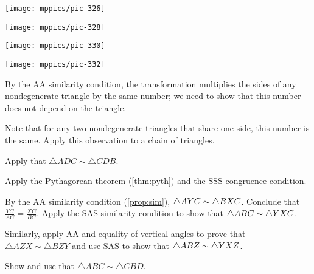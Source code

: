 \begin{multicols}{2}
\begin{Figure}
\begin{minipage}{.49\textwidth}
\centering
\texttt{[image: mppics/pic-326]}
\end{minipage}
\hfill
\begin{minipage}{.49\textwidth}
\centering
\texttt{[image: mppics/pic-328]}
\end{minipage}
\end{Figure}

\begin{Figure}
\begin{minipage}{.49\textwidth}
\centering
\texttt{[image: mppics/pic-330]}
\end{minipage}
\hfill
\begin{minipage}{.49\textwidth}
\centering
\texttt{[image: mppics/pic-332]}
\end{minipage}
\end{Figure}

\setcounter{eqtn}{0}

By the AA similarity condition, the transformation multiplies the sides of any nondegenerate triangle by the same number; we need to show that this number does not depend on the triangle. 

Note that for any two nondegenerate triangles that share one side, this number is the same.
Apply this observation to a chain of triangles.

Apply that $\triangle ADC\sim \triangle CDB$.

Apply the Pythagorean theorem (\ref{thm:pyth}) and the SSS congruence condition.

By the AA similarity condition (\ref{prop:sim}), $\triangle AYC\z\sim \triangle BXC$.
Conclude that 
$\frac{YC}{AC}=\frac{XC}{BC}$.
Apply the SAS similarity condition to show that $\triangle ABC\z\sim \triangle YXC$.

Similarly, apply AA and equality of vertical angles to prove that $\triangle AZX\sim \triangle BZY$ and use SAS to show that $\triangle ABZ\z\sim \triangle YXZ$.

Show and use that $\triangle ABC\sim \triangle CBD$.


\end{multicols}
